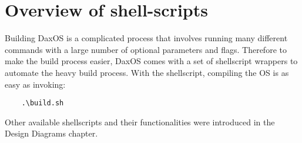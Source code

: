 \section{Overview of shell-scripts}\label{section:Overview of shell-script}
Building DaxOS is a complicated process that involves running many different commands
with a large number of optional parameters and flags. Therefore to make the build process easier,
DaxOS comes with a set of shellscript wrappers to automate the heavy build process.
With the shellscript, compiling the OS is as easy as invoking:
\begin{lstlisting}
    .\build.sh
\end{lstlisting}

Other available shellscripts and their functionalities were introduced in the Design Diagrams chapter.

